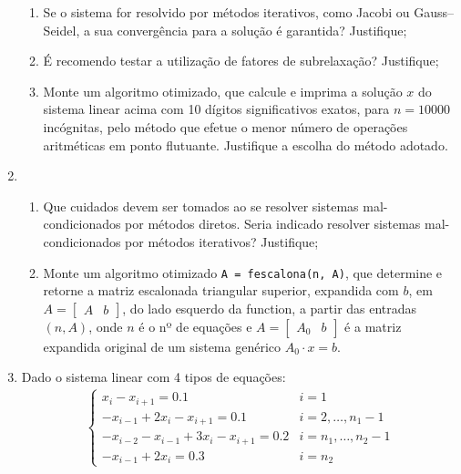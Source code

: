 \documentclass[12pt]{article}
\newenvironment{smallitem}{
    \vspace{-2mm}
    \begin{enumerate}
    \setlength{\parskip}{0pt}
    \setlength{\itemsep}{2pt}
}{
    \vspace{-2mm}
    \end{enumerate}
}
\begin{document}
\begin{enumerate}[label=\textbf{\arabic*})]
\begin{smallitem}

\item Se o sistema for resolvido por métodos iterativos, como Jacobi ou
Gauss--Seidel, a sua convergência para a solução é garantida? Justifique;

\item É recomendo testar a utilização de fatores de subrelaxação? Justifique;

\item Monte um algoritmo otimizado, que calcule e imprima a solução $x$ do sistema
linear acima com 10 dígitos significativos exatos, para $n = 10000$ incógnitas, pelo
método que efetue o menor número de operações aritméticas em ponto flutuante.
Justifique a escolha do método adotado.

\end{smallitem}

\item \begin{smallitem}

\item Que cuidados devem ser tomados ao se resolver sistemas mal-condicionados
por métodos diretos. Seria indicado resolver sistemas mal-condicionados por
métodos iterativos? Justifique;

\item Monte um algoritmo otimizado \verb!A = fescalona(n, A)!, que determine e
retorne a matriz escalonada triangular superior, expandida com $b$, em $A =
\begin{bmatrix} A & b \end{bmatrix}$, do lado esquerdo da function, a partir das
entradas $(n, A)$, onde $n$ é o nº de equações e $A = \begin{bmatrix} A_0 & b
\end{bmatrix}$ é a matriz expandida original de um sistema genérico $A_0 \cdot x
= b$.

\end{smallitem}

\item Dado o sistema linear com 4 tipos de equações:
\begin{align*}
\begin{cases}
x_i - x_{i + 1} = 0.1 &
i = 1 \\
- x_{i - 1} + 2x_i - x_{i + 1} = 0.1 &
i = 2, \dots, n_1 - 1 \\
- x_{i - 2} - x_{i - 1} + 3x_i - x_{i + 1} = 0.2 &
i = n_1, \dots, n_2 - 1 \\
- x_{i - 1} + 2x_i = 0.3 &
i = n_2
\end{cases}
\end{align*}


\end{enumerate}
\end{document}
